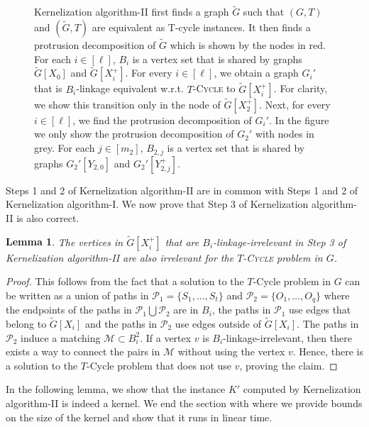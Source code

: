 \documentclass{article}
\newtheorem{lemma}[theorem]{Lemma}
\numberwithin{claimcounter}{lemma}
\newcommand{\tcycle}{$T$-\textsc{Cycle}\xspace}
\begin{document}
\begin{figure}[!htb]
{\begin{tikzpicture}
\end{tikzpicture}
}
    \caption{{\sc Kernelization algorithm-II} first finds a graph $\tilde{G}$ such that $(G,T)$ and $(\tilde{G},T)$ are equivalent as T-cycle instances. It then finds a protrusion decomposition of $\tilde{G}$ which is shown by the nodes in red. For each $i \in [\ell]$, $B_i$ is a vertex set that is shared by graphs $\tilde{G}[X_0]$ and $\tilde{G}[X_i^+]$. For every $i\in [\ell]$, we  obtain a graph $G_i'$  that is  $B_i$-linkage equivalent w.r.t. \tcycle to $\tilde{G}[X_i^+]$. For clarity, we show this transition only in the node of $\tilde{G}[X_2^+]$. Next, for every $i\in [\ell]$, we find the protrusion decomposition of $G_i'$. In the figure we only show the protrusion decomposition of $G_2'$ with nodes in grey. For each $j \in [m_2]$, $B_{2,j}$ is a vertex set that is shared by graphs $G_2'[Y_{2,0}]$ and $G_2'[Y_{2,j}^+]$.} \label{fig:kerneltwo}
\end{figure}

Steps 1 and 2 of {\sc Kernelization algorithm-II} are in common with Steps 1 and 2 of  {\sc Kernelization algorithm-I}. We now prove that Step 3 of {\sc Kernelization algorithm-II} is also correct.

\begin{lemma} \label{lem:linkirrelevant}
       The vertices in $\tilde{G}[X_i^+]$ that are $B_i$-linkage-irrelevant in Step 3 of {\sc Kernelization algorithm-II} are also irrelevant for the \tcycle problem in $G$. 
\end{lemma}
\begin{proof}
    This follows from the fact that  a solution to the {\sc $T$-Cycle} problem in $G$  can be written as a union  of paths in $\mathcal{P}_1 = \{S_1, \dots, S_t\}$ and $\mathcal{P}_2 = \{O_1, \dots, O_q\}$ where the endpoints of the paths in  $\mathcal{P}_1 \bigcup \mathcal{P}_2$ are in $B_i$,  the paths in $\mathcal{P}_1$ use edges that belong to $\tilde{G}[X_i]$ and the paths in $\mathcal{P}_2$ use edges outside of $\tilde{G}[X_i]$. The paths in $\mathcal{P}_2$ induce a matching $\mathcal{M} \subset B_i^2$. If a vertex $v$  is $B_i$-linkage-irrelevant, then there exists a way to connect the pairs in $\mathcal{M} $ without using the vertex $v$. Hence, there is a solution to the  {\sc $T$-Cycle} problem that does not use $v$, proving the claim.
\end{proof}

In the following lemma, we show that the instance $K'$ computed by {\sc Kernelization algorithm-II} is indeed a kernel. We end the section with  where we provide bounds on the size of the kernel and show that it runs in linear time. 
\end{document}

